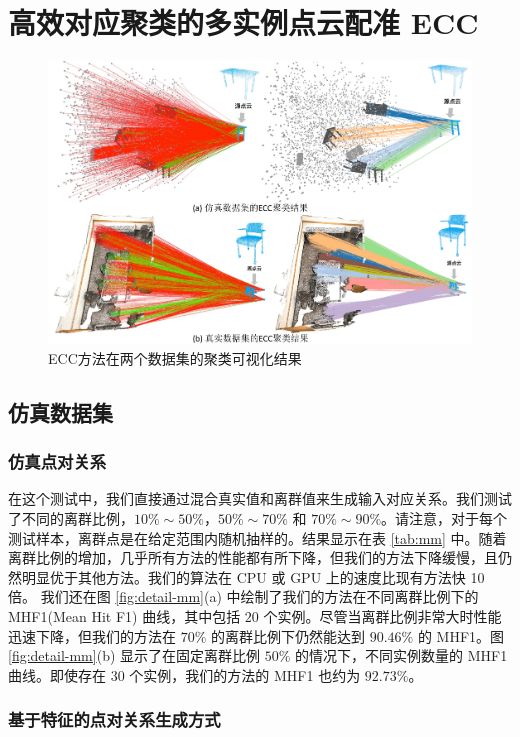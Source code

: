 \section{高效对应聚类的多实例点云配准 ECC}
\begin{figure}[ht]
        \centering  
        \includegraphics[width=0.75\linewidth]{images/ECC_cluster.pdf}
        \caption{ECC方法在两个数据集的聚类可视化结果}
        \label{fig:ECC_cluster}
\end{figure}

\subsection{仿真数据集}
\subsubsection{仿真点对关系}
在这个测试中，我们直接通过混合真实值和离群值来生成输入对应关系。我们测试了不同的离群比例，$10\%\sim50\%$，$50\%\sim70\%$ 和 $70\%\sim90\%$。请注意，对于每个测试样本，离群点是在给定范围内随机抽样的。结果显示在表 \ref{tab:mm} 中。随着离群比例的增加，几乎所有方法的性能都有所下降，但我们的方法下降缓慢，且仍然明显优于其他方法。我们的算法在 CPU 或 GPU 上的速度比现有方法快 10 倍。
我们还在图 \ref{fig:detail-mm}(a) 中绘制了我们的方法在不同离群比例下的 MHF1(Mean Hit F1) 曲线，其中包括 $20$ 个实例。尽管当离群比例非常大时性能迅速下降，但我们的方法在 $70\%$ 的离群比例下仍然能达到 $90.46\%$ 的 MHF1。图 \ref{fig:detail-mm}(b) 显示了在固定离群比例 $50\%$ 的情况下，不同实例数量的 MHF1 曲线。即使存在 $30$ 个实例，我们的方法的 MHF1 也约为 $92.73\%$。

\subsubsection{基于特征的点对关系生成方式}

